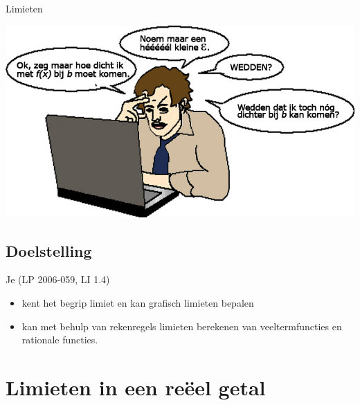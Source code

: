 \documentclass[12pt]{article}
\begin{document}
\pagestyle{fancy}
\lhead{}


\thispagestyle{empty}
\begin{center}
  \begin{mdframed}
    \centering
    \fontsize{50}{60}\selectfont Limieten
  \end{mdframed}
  \vfill
  \includegraphics[width=\textwidth]{limieten}
  \vfill
\end{center}

\subsection*{Doelstelling}
Je \hfill  {\scriptsize(LP 2006-059, LI 1.4)}
\begin{itemize}
\item kent het begrip limiet en kan grafisch limieten bepalen
\item kan met behulp van rekenregels limieten berekenen van veeltermfuncties en rationale functies.
\end{itemize}

\thispagestyle{empty}
\mbox{}
\newpage
\clearpage
\thispagestyle{empty}
\tableofcontents
\newpage
\clearpage
{}

\lhead{}

\onehalfspacing


\section{Limieten in een reëel getal}
\end{document}
